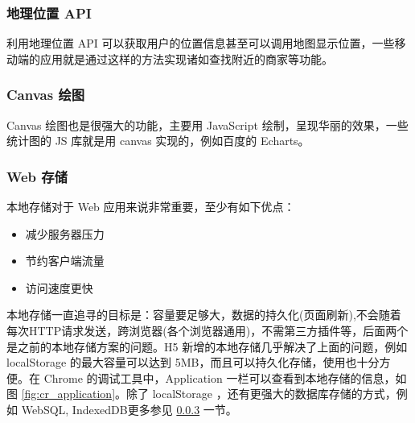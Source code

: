 \documentclass[UTF8]{ctexbook}
\begin{document}
{{            \subsubsection{地理位置 API}
              \label{subsubsec:地理位置_api}
                利用地理位置 API 可以获取用户的位置信息甚至可以调用地图显示位置，一些移动端的应用就是通过这样的方法实现诸如查找附近的商家等功能。

            \subsubsection{Canvas 绘图}
              \label{subsubsec:canvas_绘图}
                Canvas 绘图也是很强大的功能，主要用 JavaScript 绘制，呈现华丽的效果，一些统计图的 JS 库就是用 canvas 实现的，例如百度的 Echarts。

            \subsubsection{Web 存储}
              \label{subsubsec:web_存储}
                本地存储对于 Web 应用来说非常重要，至少有如下优点：
                \begin{itemize}
                  \item 减少服务器压力
                  \item 节约客户端流量
                  \item 访问速度更快
                \end{itemize}
                本地存储一直追寻的目标是：容量要足够大，数据的持久化(页面刷新),不会随着每次HTTP请求发送，跨浏览器(各个浏览器通用)，不需第三方插件等，后面两个是之前的本地存储方案的问题。H5 新增的本地存储几乎解决了上面的问题，例如 localStorage 的最大容量可以达到 5MB，而且可以持久化存储，使用也十分方便。在 Chrome 的调试工具中，Application 一栏可以查看到本地存储的信息，如图 \ref{fig:cr_application}。除了 localStorage ，还有更强大的数据库存储的方式，例如 WebSQL, IndexedDB更多参见 \ref{subsubsec:web_存储} 一节。

}}
\end{document}

